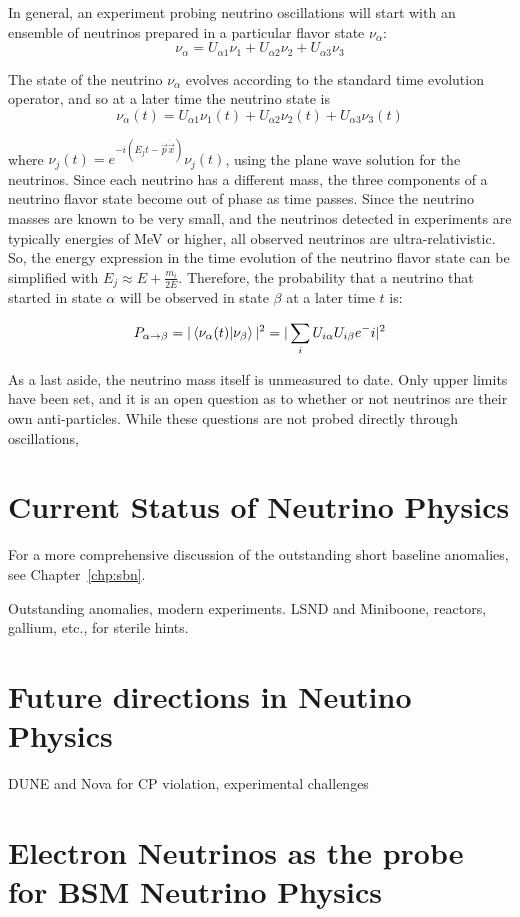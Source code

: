 In general, an experiment probing neutrino oscillations will start with an ensemble of neutrinos prepared in a particular flavor state $\nu_\alpha$:
\begin{equation*}
\nu_\alpha = U_{\alpha 1} \nu_1 + U_{\alpha 2} \nu_2 + U_{\alpha 3} \nu_3
\end{equation*}

The state of the neutrino $\nu_\alpha$ evolves according to the standard time evolution operator, and so at a later time the neutrino state is  
\begin{equation*}
\nu_\alpha (t) = U_{\alpha 1} \nu_1(t) + U_{\alpha 2} \nu_2(t) + U_{\alpha 3} \nu_3(t)
\end{equation*}

where $\nu_{j}(t) = e^{-i ( E_j t - \vec{p} \dot \vec{x})} \nu_j (t)$, using the plane wave solution for the neutrinos.  Since each neutrino has a different mass, the three components of a neutrino flavor state become out of phase as time passes.  Since the neutrino masses are known to be very small, and the neutrinos detected in experiments are typically energies of MeV or higher, all observed neutrinos are ultra-relativistic.  So, the energy expression in the time evolution of the neutrino flavor state can be simplified with $E_j \approx E + \frac{m_i}{2E}$.  Therefore, the probability that a neutrino that started in state $\alpha$ will be observed in state $\beta$ at a later time $t$ is:

\begin{equation*}
P_{\alpha\rightarrow\beta} = |\braket{\nu_\alpha(t) | \nu_\beta}|^2 = |\sum_i U_{i\alpha} U_{i\beta} e^-i|^2
\end{equation*}

As a last aside, the neutrino mass itself is unmeasured to date.  Only upper limits have been set, and it is an open question as to whether or not neutrinos are their own anti-particles.  While these questions are not probed directly through oscillations, 



\section{Current Status of Neutrino Physics}

For a more comprehensive discussion of the outstanding short baseline anomalies, see Chapter~\ref{chp:sbn}.

Outstanding anomalies, modern experiments.  LSND and Miniboone, reactors, gallium, etc., for sterile hints.



\section{Future directions in Neutino Physics}
\label{sec:future_experiments}
DUNE and Nova for CP violation, experimental challenges

\section{Electron Neutrinos as the probe for BSM Neutrino Physics}